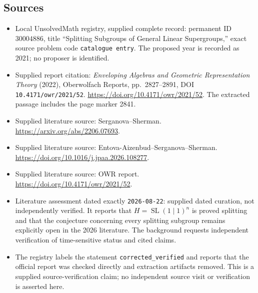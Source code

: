 \documentclass[11pt]{article}
\begin{document}
\subsection{Sources}
\begin{itemize}
\item Local UnsolvedMath registry, supplied complete record: permanent ID \(30004886\), title ``Splitting Subgroups of General Linear Supergroups,'' exact source problem code \texttt{catalogue entry}. The proposed year is recorded as 2021; no proposer is identified.
\item Supplied report citation: \emph{Enveloping Algebras and Geometric Representation Theory} (2022), Oberwolfach Reports, pp.\ 2827--2891, DOI \texttt{10.4171/owr/2021/52}. \url{https://doi.org/10.4171/owr/2021/52}. The extracted passage includes the page marker 2841.
\item Supplied literature source: Serganova--Sherman. \url{https://arxiv.org/abs/2206.07693}.
\item Supplied literature source: Entova-Aizenbud--Serganova--Sherman. \url{https://doi.org/10.1016/j.jpaa.2026.108277}.
\item Supplied literature source: OWR report. \url{https://doi.org/10.4171/owr/2021/52}.
\item Literature assessment dated exactly \texttt{2026-08-22}: supplied dated curation, not independently verified. It reports that \(H=\operatorname{SL}(1\mid1)^n\) is proved splitting and that the conjecture concerning every splitting subgroup remains explicitly open in the 2026 literature. The background requests independent verification of time-sensitive status and cited claims.
\item The registry labels the statement \texttt{corrected\_verified} and reports that the official report was checked directly and extraction artifacts removed. This is a supplied source-verification claim; no independent source visit or verification is asserted here.
\end{itemize}
\end{document}
